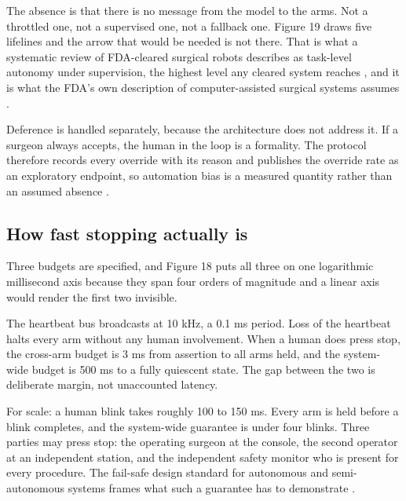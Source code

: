 The absence is that there is no message from the model to the arms. Not a
throttled one, not a supervised one, not a fallback one. Figure 19 draws five
lifelines and the arrow that would be needed is not there. That is what a
systematic review of FDA-cleared surgical robots describes as task-level
autonomy under supervision, the highest level any cleared system reaches
\cite{LeeAuto2024X}, and it is what the FDA's own description of
computer-assisted surgical systems assumes \cite{FDARobot2022}.

Deference is handled separately, because the architecture does not address it.
If a surgeon always accepts, the human in the loop is a formality. The protocol
therefore records every override with its reason and publishes the override rate
as an exploratory endpoint, so automation bias is a measured quantity rather
than an assumed absence \cite{FDATrans2024}.

\subsection{How fast stopping actually is}

Three budgets are specified, and Figure 18 puts all three on one logarithmic
millisecond axis because they span four orders of magnitude and a linear axis
would render the first two invisible.

The heartbeat bus broadcasts at 10 kHz, a 0.1 ms period. Loss of the heartbeat
halts every arm without any human involvement. When a human does press stop, the
cross-arm budget is 3 ms from assertion to all arms held, and the system-wide
budget is 500 ms to a fully quiescent state. The gap between the two is
deliberate margin, not unaccounted latency.

For scale: a human blink takes roughly 100 to 150 ms. Every arm is held before a
blink completes, and the system-wide guarantee is under four blinks. Three
parties may press stop: the operating surgeon at the console, the second
operator at an independent station, and the independent safety monitor who is
present for every procedure. The fail-safe design standard for autonomous and
semi-autonomous systems frames what such a guarantee has to demonstrate
\cite{ieee7009}.

